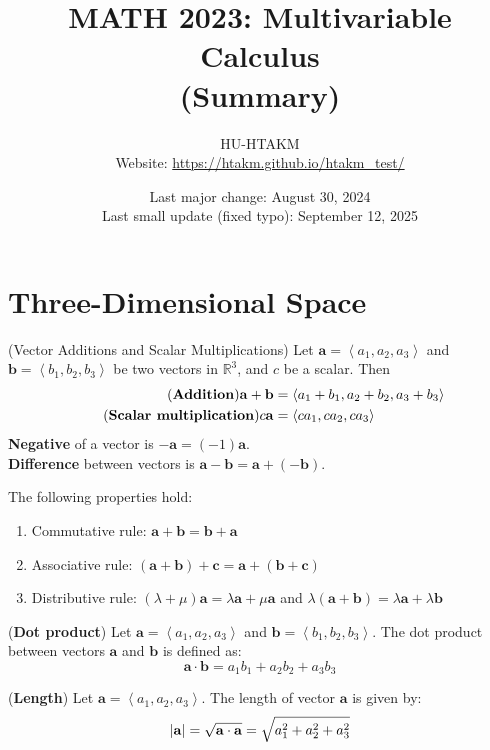 \documentclass{huhtakm-template-book}
\title{MATH 2023: Multivariable Calculus \\ (Summary)}
\author{
	HU-HTAKM\\
	Website: \url{https://htakm.github.io/htakm_test/}
}
\date{
	Last major change: August 30, 2024\\
	Last small update (fixed typo): September 12, 2025
}
\begin{document}
\maketitle
\chapter{Three-Dimensional Space}
\begin{defn}(Vector Additions and Scalar Multiplications)
    Let $\mathbf{a}=\left<a_{1},a_{2},a_{3}\right>$ and $\mathbf{b}=\left<b_{1},b_{2},b_{3}\right>$ be two vectors in $\mathbb{R}^{3}$, and $c$ be a scalar. Then
    \begin{align*}
        \tag{\textbf{Addition}}
        \mathbf{a}+\mathbf{b}&=\left<a_{1}+b_{1},a_{2}+b_{2},a_{3}+b_{3}\right>\\
        \tag{\textbf{Scalar multiplication}}
        c\mathbf{a}&=\left<ca_{1},ca_{2},ca_{3}\right>
    \end{align*}
    \textbf{Negative} of a vector is $-\mathbf{a}=(-1)\mathbf{a}$.\\
    \textbf{Difference} between vectors is $\mathbf{a}-\mathbf{b}=\mathbf{a}+(-\mathbf{b})$.
\end{defn}
\begin{lem}
    The following properties hold:
    \begin{enumerate}
        \item Commutative rule: $\mathbf{a}+\mathbf{b}=\mathbf{b}+\mathbf{a}$
        \item Associative rule: $(\mathbf{a}+\mathbf{b})+\mathbf{c}=\mathbf{a}+(\mathbf{b}+\mathbf{c})$
        \item Distributive rule: $(\lambda+\mu)\mathbf{a}=\lambda\mathbf{a}+\mu\mathbf{a}$ and $\lambda(\mathbf{a}+\mathbf{b})=\lambda\mathbf{a}+\lambda\mathbf{b}$
    \end{enumerate}
\end{lem}
\begin{defn}(\textbf{Dot product})
    Let $\mathbf{a}=\left<a_{1},a_{2},a_{3}\right>$ and $\mathbf{b}=\left<b_{1},b_{2},b_{3}\right>$. The dot product between vectors $\mathbf{a}$ and $\mathbf{b}$ is defined as:
    \begin{equation*}
        \mathbf{a}\cdot\mathbf{b}=a_{1}b_{1}+a_{2}b_{2}+a_{3}b_{3}
    \end{equation*}
\end{defn}
\begin{defn}(\textbf{Length})
    Let $\mathbf{a}=\left<a_{1},a_{2},a_{3}\right>$. The length of vector $\mathbf{a}$ is given by:
    \begin{equation*}
        \left|{\mathbf{a}}\right|=\sqrt{\mathbf{a}\cdot\mathbf{a}}=\sqrt{a_{1}^{2}+a_{2}^{2}+a_{3}^{2}}
    \end{equation*}
\end{defn}
\end{document}
